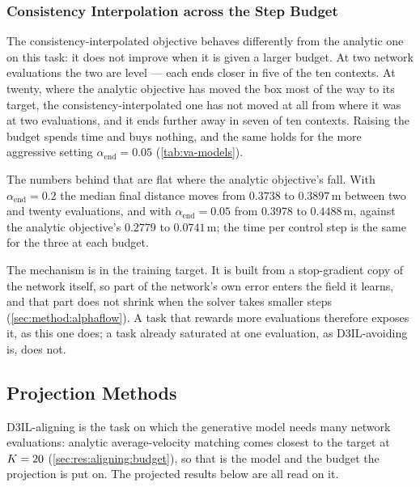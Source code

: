 \subsubsection{Consistency Interpolation across the Step Budget}\label{sec:res:aligning:consistency}

The consistency-interpolated objective behaves differently from the analytic one on this task: it does
not improve when it is given a larger budget. At two network evaluations the two are level --- each ends
closer in five of the ten contexts. At twenty, where the analytic objective has moved the box most of the
way to its target, the consistency-interpolated one has not moved at all from where it was at two
evaluations, and it ends further away in seven of ten contexts. Raising the budget spends time and buys
nothing, and the same holds for the more aggressive setting $\alpha_{\mathrm{end}}=0.05$
(\autoref{tab:va-models}).

The numbers behind that are flat where the analytic objective's fall. With
$\alpha_{\mathrm{end}}=0.2$ the median final distance moves from $0.3738$ to $0.3897$\,m between two and
twenty evaluations, and with $\alpha_{\mathrm{end}}=0.05$ from $0.3978$ to $0.4488$\,m, against the analytic
objective's $0.2779$ to $0.0741$\,m; the time per control step is the same for the three at each budget.

The mechanism is in the training target. It is built from a stop-gradient copy of the network itself, so
part of the network's own error enters the field it learns, and that part does not shrink when the solver
takes smaller steps (\autoref{sec:method:alphaflow}). A task that rewards more evaluations therefore
exposes it, as this one does; a task already saturated at one evaluation, as D3IL-avoiding is, does not.

\subsection{Projection Methods}\label{sec:res:aligning:projection}

D3IL-aligning is the task on which the generative model needs many network evaluations: analytic
average-velocity matching comes closest to the target at $K=20$ (\autoref{sec:res:aligning:budget}),
so that is the model and the budget the projection is put on. The projected results below are all read
on it.

